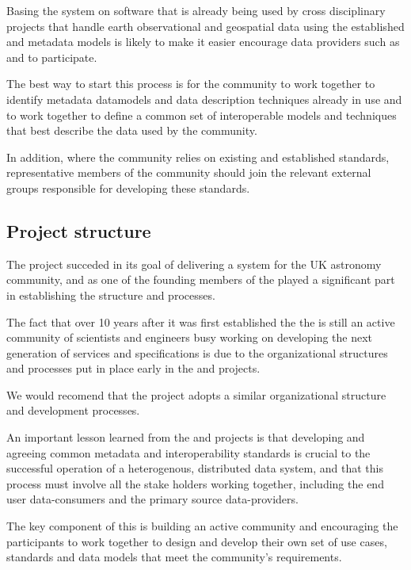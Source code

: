 \documentclass{article}
\begin{document}
Basing the \cite{trop} system on software that is already being used by cross
disciplinary projects that handle earth observational and geospatial data
using the established \cite{gis} and \cite{eml} metadata models is likely
to make it easier encourage data providers such as \cite{nasa-jpl-carbon}
and \cite{whrc} to participate.

The best way to start this process is for the \cite{trop} community to work
together to identify metadata datamodels and data description techniques
already in use and to work together to define a common set of interoperable
models and techniques that best describe the data used by the \cite{trop}
community.

In addition, where the \cite{trop} community relies on existing and established
standards, representative members of the \cite{trop} community should join
the relevant external groups responsible for developing these standards.

\subsection{Project structure}

The \cite{astro} project succeded in its goal of delivering a \cite{vo}
system for the UK astronomy community, and as one of the founding members
of the \cite{ivoa} played a significant part in establishing the \cite{ivoa}
structure and processes.

The fact that over 10 years after it was first established the the \cite{ivoa}
is still an active community of scientists and engineers busy working on
developing the next generation of services and specifications is due to the
organizational structures and processes put in place early in the
\cite{astro} and \cite{ivoa} projects.

We would recomend that the \cite{trop} project adopts a similar
organizational structure and development processes.

An important lesson learned from the \cite{astro} and \cite{ivoa}
projects is that developing and agreeing common metadata and
interoperability standards is crucial to the successful operation
of a heterogenous, distributed data system, and that this process
must involve all the stake holders working together, including
the end user data-consumers and the primary source data-providers. 

The key component of this is building an active community and
encouraging the participants to work together to design and develop
their own set of use cases, standards and data models that meet the
community's requirements.
\end{document}
